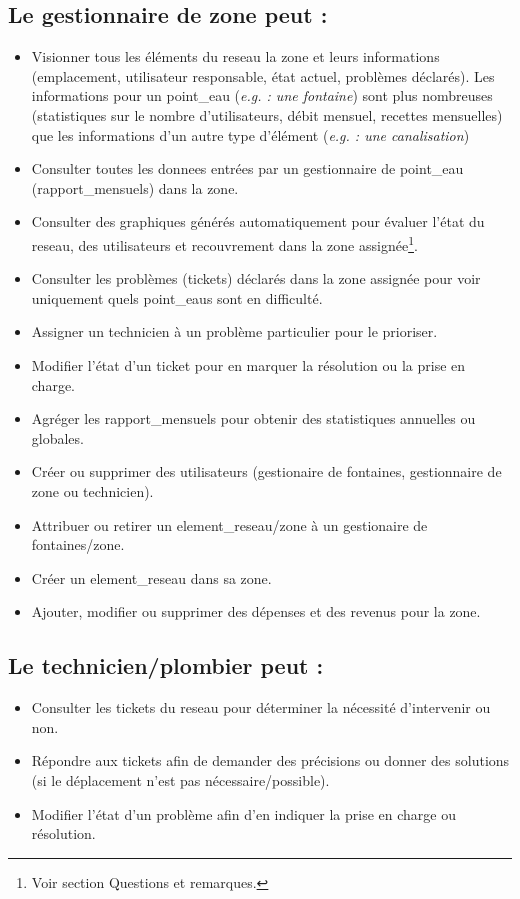 \documentclass[a4paper, 11pt]{article}
\begin{document}
\subsection{Le gestionnaire de \gls{zone} peut :}
\begin{itemize}
  \item Visionner tous les éléments du \gls{reseau} la \gls{zone} et leurs informations (emplacement, \gls{utilisateur} responsable, état actuel, problèmes déclarés). Les informations pour un \gls{point_eau} (\emph{e.g. : une \gls{fontaine}}) sont plus nombreuses (statistiques sur le nombre d'\glspl{utilisateur}, débit mensuel, recettes mensuelles) que les informations d'un autre type d'élément (\emph{e.g. : une canalisation})
  \item Consulter toutes les \glspl{donnee} entrées par un gestionnaire de \gls{point_eau} (\glspl{rapport_mensuel}) dans la \gls{zone}.
  \item Consulter des graphiques générés automatiquement pour évaluer l'état du \gls{reseau}, des \glspl{utilisateur} et recouvrement dans la \gls{zone} assignée\footnote{Voir section Questions et remarques.}.
  \item Consulter les problèmes (\glspl{ticket}) déclarés dans la \gls{zone} assignée pour voir uniquement quels \glspl{point_eau} sont en difficulté.
  \item Assigner un technicien à un problème particulier pour le prioriser.
  \item Modifier l'état d'un \gls{ticket} pour en marquer la résolution ou la prise en charge.
  \item Agréger les \glspl{rapport_mensuel} pour obtenir des statistiques annuelles ou globales. %
  \item Créer ou supprimer des \glspl{utilisateur} (gestionaire de \glspl{fontaine}, gestionnaire de \gls{zone} ou technicien). %
  \item Attribuer ou retirer un \gls{element_reseau}/\gls{zone} à un gestionaire de \glspl{fontaine}/\gls{zone}.
  \item Créer un \gls{element_reseau} dans sa \gls{zone}.
  \item Ajouter, modifier ou supprimer des dépenses et des revenus pour la \gls{zone}.
\end{itemize}

\subsection{Le technicien/plombier peut :}
\begin{itemize}
  \item Consulter les \glspl{ticket} du \gls{reseau} pour déterminer la nécessité d'intervenir ou non.
  \item Répondre aux \glspl{ticket} afin de demander des précisions ou donner des solutions (si le déplacement n'est pas nécessaire/possible).
  \item Modifier l'état d'un problème afin d'en indiquer la prise en charge ou résolution.
\end{itemize}
\end{document}

